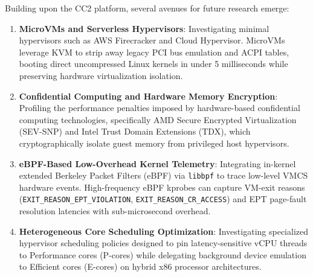 Building upon the CC2 platform, several avenues for future research emerge:
\begin{enumerate}
    \item \textbf{MicroVMs and Serverless Hypervisors}: Investigating minimal hypervisors such as AWS Firecracker and Cloud Hypervisor. MicroVMs leverage KVM to strip away legacy PCI bus emulation and ACPI tables, booting direct uncompressed Linux kernels in under 5 milliseconds while preserving hardware virtualization isolation.
    \item \textbf{Confidential Computing and Hardware Memory Encryption}: Profiling the performance penalties imposed by hardware-based confidential computing technologies, specifically AMD Secure Encrypted Virtualization (SEV-SNP) and Intel Trust Domain Extensions (TDX), which cryptographically isolate guest memory from privileged host hypervisors.
    \item \textbf{eBPF-Based Low-Overhead Kernel Telemetry}: Integrating in-kernel extended Berkeley Packet Filters (eBPF) via \texttt{libbpf} to trace low-level VMCS hardware events. High-frequency eBPF kprobes can capture VM-exit reasons (\texttt{EXIT\_REASON\_EPT\_VIOLATION}, \texttt{EXIT\_REASON\_CR\_ACCESS}) and EPT page-fault resolution latencies with sub-microsecond overhead.
    \item \textbf{Heterogeneous Core Scheduling Optimization}: Investigating specialized hypervisor scheduling policies designed to pin latency-sensitive vCPU threads to Performance cores (P-cores) while delegating background device emulation to Efficient cores (E-cores) on hybrid x86 processor architectures.
\end{enumerate}
